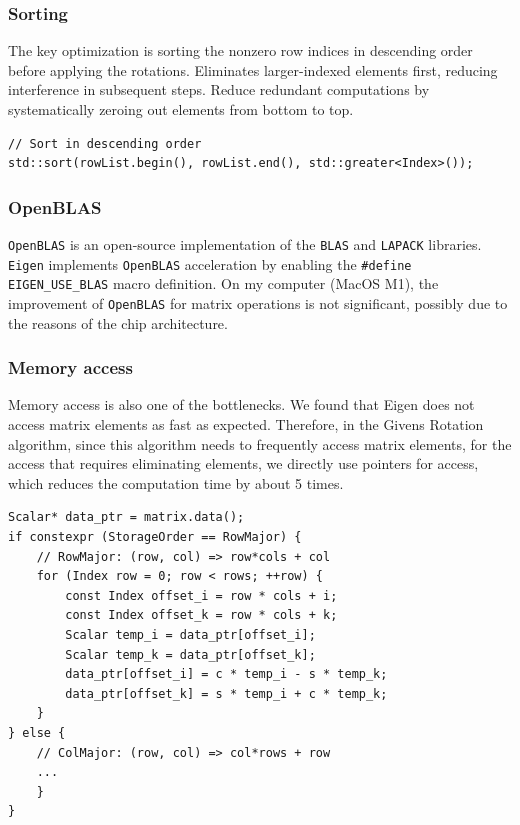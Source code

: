 \documentclass[11pt,a4paper]{article}
\begin{document}
\subsubsection*{Sorting}
The key optimization is sorting the nonzero row indices in descending order before applying the rotations. Eliminates larger-indexed elements first, reducing interference in subsequent steps. Reduce redundant computations by systematically zeroing out elements from bottom to top.
\begin{verbatim}
// Sort in descending order
std::sort(rowList.begin(), rowList.end(), std::greater<Index>());
\end{verbatim}

\subsubsection*{OpenBLAS}
\texttt{OpenBLAS} is an open-source implementation of the \texttt{BLAS} and \texttt{LAPACK} libraries. \texttt{Eigen} implements \texttt{OpenBLAS} acceleration by enabling the \texttt{\#define EIGEN\_USE\_BLAS} macro definition. On my computer (MacOS M1), the improvement of \texttt{OpenBLAS} for matrix operations is not significant, possibly due to the reasons of the chip architecture.
 
\subsubsection*{Memory access}
Memory access is also one of the bottlenecks. We found that Eigen does not access matrix elements as fast as expected. Therefore, in the Givens Rotation algorithm, since this algorithm needs to frequently access matrix elements, for the access that requires eliminating elements, we directly use pointers for access, which reduces the computation time by about 5 times.
\begin{verbatim}
Scalar* data_ptr = matrix.data();
if constexpr (StorageOrder == RowMajor) {
    // RowMajor: (row, col) => row*cols + col
    for (Index row = 0; row < rows; ++row) {
        const Index offset_i = row * cols + i;
        const Index offset_k = row * cols + k;
        Scalar temp_i = data_ptr[offset_i];
        Scalar temp_k = data_ptr[offset_k];
        data_ptr[offset_i] = c * temp_i - s * temp_k;
        data_ptr[offset_k] = s * temp_i + c * temp_k;
    }
} else {
    // ColMajor: (row, col) => col*rows + row
    ...
    }
}
\end{verbatim}
\end{document}
